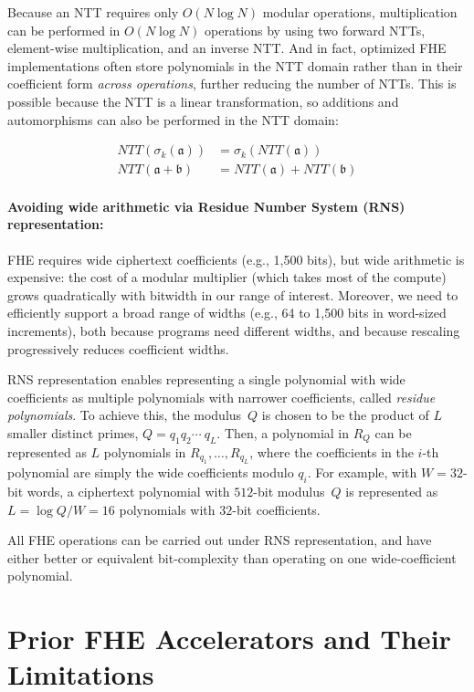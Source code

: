 Because an NTT requires only $O(N \log N)$ modular operations, multiplication
can be performed in $O(N \log N)$ operations by using two forward NTTs,
element-wise multiplication, and an inverse NTT. And in fact, optimized FHE
implementations often store polynomials in the NTT domain rather than in their
coefficient form \emph{across operations}, further reducing the number of NTTs.
This is possible because the NTT is a linear transformation, so additions and
automorphisms can also be performed in the NTT domain:

\begin{align*}
    NTT(\sigma_k(\mathfrak{a})) &= \sigma_k(NTT(\mathfrak{a})) \\
    NTT(\mathfrak{a} + \mathfrak{b}) &= NTT(\mathfrak{a}) + NTT(\mathfrak{b})
\end{align*}

\paragraph{Avoiding wide arithmetic via Residue Number System (RNS) representation:}
FHE requires wide ciphertext coefficients (e.g., 1,500 bits), but wide
arithmetic is expensive: the cost of a modular multiplier (which takes most of
the compute) grows quadratically with bitwidth in our range of interest.
Moreover, we need to efficiently support a broad range of widths (e.g., 64 to
1,500 bits in word-sized increments), both because programs need different
widths, and because rescaling progressively reduces coefficient widths.

RNS representation \cite{garner:1959:residue} enables representing a single
polynomial with wide coefficients as multiple polynomials with narrower
coefficients, called \emph{residue polynomials}. To achieve this, the
modulus~$Q$  is chosen to be the product of $L$ smaller distinct primes, $Q =
q_1q_2\cdots\ q_L$. Then, a polynomial in $R_Q$ can be represented as $L$
polynomials in $R_{q_1}, \ldots, R_{q_L}$, where the coefficients in the $i$-th
polynomial are simply the wide coefficients modulo $q_i$. For example, with $W
= 32$-bit words, a ciphertext polynomial with $512$-bit modulus~$Q$ is
represented as $L = \log Q/W = 16$ polynomials with $32$-bit coefficients.

All FHE operations can be carried out under RNS representation, and have either
better or equivalent bit-complexity than operating on one wide-coefficient
polynomial.

\section{Prior FHE Accelerators and Their Limitations}\label{sec:drawbacks}


